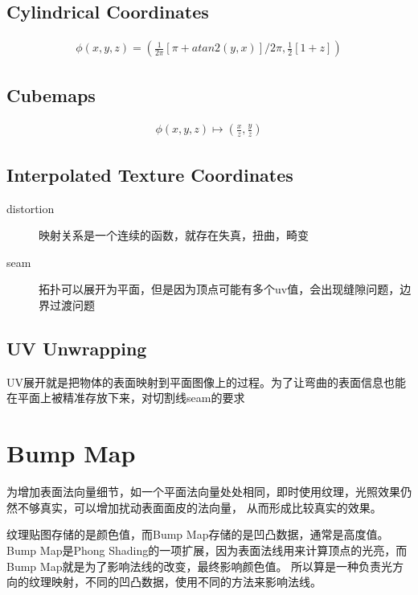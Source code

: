 \subsection{Cylindrical Coordinates}

\begin{align*}
    \phi(x,y,z) = (\frac{1}{2\pi}[\pi+atan2(y,x)]/2\pi,\frac{1}{2}[1+z])
\end{align*}

\subsection{Cubemaps}

\begin{align*}
    \phi(x,y,z) \mapsto (\frac{x}{z},\frac{y}{z})
\end{align*}

\subsection{Interpolated Texture Coordinates }

\begin{description}
    \item [distortion] \textsf{映射关系是一个连续的函数，就存在失真，扭曲，畸变}
    \item [seam] \textsf{拓扑可以展开为平面，但是因为顶点可能有多个uv值，会出现缝隙问题，边界过渡问题}
\end{description}

\subsection{UV Unwrapping}

UV展开就是把物体的表面映射到平面图像上的过程。为了让弯曲的表面信息也能在平面上被精准存放下来，对切割线seam的要求

\section{Bump Map}

为增加表面法向量细节，如一个平面法向量处处相同，即时使用纹理，光照效果仍然不够真实，可以增加扰动表面面皮的法向量，
从而形成比较真实的效果。

纹理贴图存储的是颜色值，而Bump Map存储的是凹凸数据，通常是高度值。
Bump Map是Phong Shading的一项扩展，因为表面法线用来计算顶点的光亮，而Bump Map就是为了影响法线的改变，最终影响颜色值。
所以算是一种负责光方向的纹理映射，不同的凹凸数据，使用不同的方法来影响法线。

